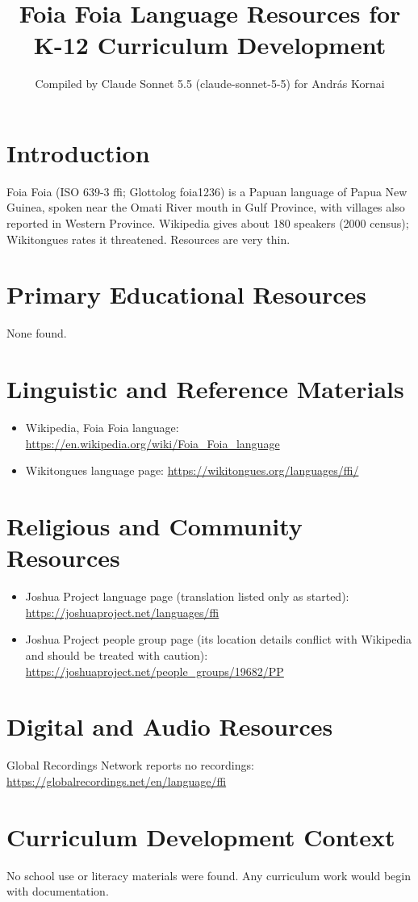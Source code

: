 \documentclass[12pt]{article}
\title{Foia Foia Language Resources for K-12 Curriculum Development}
\author{Compiled by Claude Sonnet 5.5 (claude-sonnet-5-5) for Andr\'as Kornai}
\date{}
\begin{document}
\maketitle
\section{Introduction}
Foia Foia (ISO 639-3 ffi; Glottolog foia1236) is a Papuan language of Papua New Guinea, spoken near the Omati River mouth in Gulf Province, with villages also reported in Western Province. Wikipedia gives about 180 speakers (2000 census); Wikitongues rates it threatened. Resources are very thin.
\section{Primary Educational Resources}
None found.
\section{Linguistic and Reference Materials}
\begin{itemize}
\item Wikipedia, Foia Foia language: \url{https://en.wikipedia.org/wiki/Foia_Foia_language}
\item Wikitongues language page: \url{https://wikitongues.org/languages/ffi/}
\end{itemize}
\section{Religious and Community Resources}
\begin{itemize}
\item Joshua Project language page (translation listed only as started): \url{https://joshuaproject.net/languages/ffi}
\item Joshua Project people group page (its location details conflict with Wikipedia and should be treated with caution): \url{https://joshuaproject.net/people_groups/19682/PP}
\end{itemize}
\section{Digital and Audio Resources}
Global Recordings Network reports no recordings: \url{https://globalrecordings.net/en/language/ffi}
\section{Curriculum Development Context}
No school use or literacy materials were found. Any curriculum work would begin with documentation.
\end{document}
